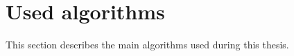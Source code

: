 \section{Used algorithms}

This section describes the main algorithms used during this thesis. 






